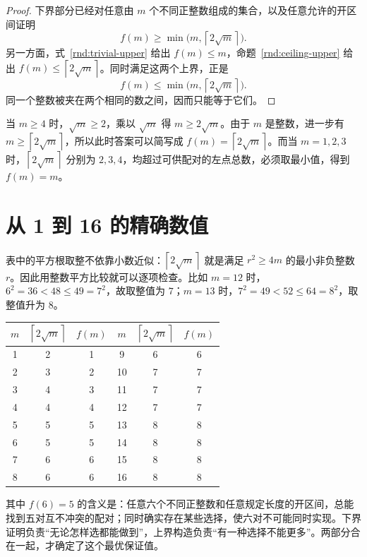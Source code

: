 \documentclass[UTF8,a4paper,oneside,openany,fontset=fandol,zihao=-4]{ctexbook}
\theoremstyle{guide}
\newcommand{\ceil}[1]{\left\lceil#1\right\rceil}
\begin{document}
\begin{proof}
下界部分已经对任意由 $m$ 个不同正整数组成的集合，以及任意允许的开区间证明
\[
f(m)\geq\min\bigl(m,\ceil{2\sqrt m}\bigr).
\]
另一方面，式~\eqref{rnd:trivial-upper} 给出 $f(m)\leq m$，命题~\ref{rnd:ceiling-upper} 给出 $f(m)\leq\ceil{2\sqrt m}$。同时满足这两个上界，正是
\[
f(m)\leq\min\bigl(m,\ceil{2\sqrt m}\bigr).
\]
同一个整数被夹在两个相同的数之间，因而只能等于它们。
\end{proof}

当 $m\geq4$ 时，$\sqrt m\geq2$，乘以 $\sqrt m$ 得 $m\geq2\sqrt m$。由于 $m$ 是整数，进一步有 $m\geq\ceil{2\sqrt m}$，所以此时答案可以简写成 $f(m)=\ceil{2\sqrt m}$。而当 $m=1,2,3$ 时，$\ceil{2\sqrt m}$ 分别为 $2,3,4$，均超过可供配对的左点总数，必须取最小值，得到 $f(m)=m$。

\section{从 1 到 16 的精确数值}

表中的平方根取整不依靠小数近似：$\ceil{2\sqrt m}$ 就是满足 $r^2\geq4m$ 的最小非负整数 $r$。因此用整数平方比较就可以逐项检查。比如 $m=12$ 时，$6^2=36<48\leq49=7^2$，故取整值为 $7$；$m=13$ 时，$7^2=49<52\leq64=8^2$，取整值升为 $8$。

\begin{center}
\renewcommand{\arraystretch}{1.2}
\begin{tabular}{c|c|c@{\qquad}c|c|c}
\hline
$m$ & $\ceil{2\sqrt m}$ & $f(m)$ & $m$ & $\ceil{2\sqrt m}$ & $f(m)$\\
\hline
1 & 2 & 1 & 9 & 6 & 6\\
2 & 3 & 2 & 10 & 7 & 7\\
3 & 4 & 3 & 11 & 7 & 7\\
4 & 4 & 4 & 12 & 7 & 7\\
5 & 5 & 5 & 13 & 8 & 8\\
6 & 5 & 5 & 14 & 8 & 8\\
7 & 6 & 6 & 15 & 8 & 8\\
8 & 6 & 6 & 16 & 8 & 8\\
\hline
\end{tabular}
\end{center}

其中 $f(6)=5$ 的含义是：任意六个不同正整数和任意规定长度的开区间，总能找到五对互不冲突的配对；同时确实存在某些选择，使六对不可能同时实现。下界证明负责“无论怎样选都能做到”，上界构造负责“有一种选择不能更多”。两部分合在一起，才确定了这个最优保证值。

\end{document}
